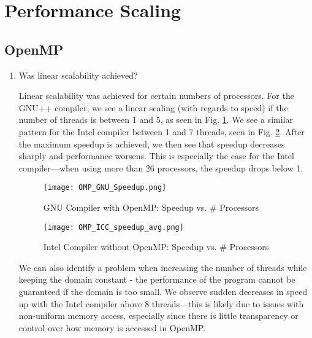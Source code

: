 \documentclass{article}
\begin{document}

\section{Performance Scaling}
\subsection{OpenMP}
\begin{enumerate}
	\item Was linear scalability achieved?

	Linear scalability was achieved for certain numbers of processors. For the GNU++ compiler, we see a linear scaling (with regards to speed) if the number of threads is between 1 and 5, as seen in Fig. \ref{fig:gnu_omp_speedup}. We see a similar pattern for the Intel compiler between 1 and 7 threads, seen in Fig. \ref{fig:gnu_icc_speedup}. After the maximum speedup is achieved, we then see that speedup decreases sharply and performance worsens. This is especially the case for the Intel compiler---when using more than 26 processors, the speedup drops below 1. 

	\begin{figure}[h!] %
	 	\begin{center}
	 		\texttt{[image: OMP\_GNU\_Speedup.png]} %
	 		\caption{GNU Compiler with OpenMP: Speedup vs. \# Processors}
	 		\label{fig:gnu_omp_speedup}
	 	\end{center}
	\end{figure}

	\begin{figure}[h!] %
	 	\begin{center}
	 		\texttt{[image: OMP\_ICC\_speedup\_avg.png]} %
	 		\caption{Intel Compiler without OpenMP: Speedup vs. \# Processors}
	 		\label{fig:gnu_icc_speedup}
	 	\end{center}
	\end{figure}
	We can also identify a problem when increasing the number of threads while keeping the domain constant - the performance of the program cannot be guaranteed if the domain is too small. We observe sudden decreases in speed up with the Intel compiler above 8 threads---this is likely due to issues with non-uniform memory access, especially since there is little transparency or control over how memory is accessed in OpenMP.


\end{enumerate}
\end{document}
